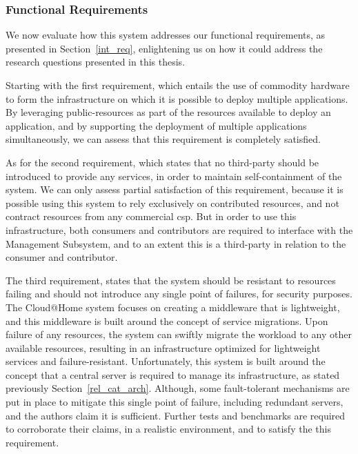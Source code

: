 \documentclass[12pt, titlepage]{uo_temp}
\begin{document}
     \subsubsection{Functional Requirements}
     We now evaluate how this system addresses our functional requirements, as presented in
     Section~\ref{int_req}, enlightening us on how it could address the research questions
     presented in this thesis.
     
     Starting with the first requirement, which entails the use of commodity hardware to
     form the infrastructure on which it is possible to deploy multiple applications. By
     leveraging public-resources as part of the resources available to deploy an
     application, and by supporting the deployment of multiple applications
     simultaneously, we can assess that this requirement is completely satisfied.
     
     As for the second requirement, which states that no third-party should be introduced
     to provide any services, in order to maintain self-containment of the system. We can
     only assess partial satisfaction of this requirement, because it is possible using
     this system to rely exclusively on contributed resources, and not contract resources
     from any commercial \gls{csp}. But in order to use this infrastructure, both
     consumers and contributors are required to interface with the Management Subsystem,
     and to an extent this is a third-party in relation to the consumer and contributor.

     The third requirement, states that the system should be resistant to resources
     failing and should not introduce any single point of failures, for security
     purposes. The Cloud@Home system focuses on creating a middleware that is lightweight,
     and this middleware is built around the concept of service migrations. Upon failure
     of any resources, the system can swiftly migrate the workload to any other available
     resources, resulting in an infrastructure optimized for lightweight services and
     failure-resistant. Unfortunately, this system is built around the concept that a
     central server is required to manage its infrastructure, as stated previously
     Section~\ref{rel_cat_arch}. Although, some fault-tolerant mechanisms are put in place
     to mitigate this single point of failure, including redundant servers, and the
     authors claim it is sufficient. Further tests and benchmarks are required to
     corroborate their claims, in a realistic environment, and to satisfy the this
     requirement.
\end{document}
